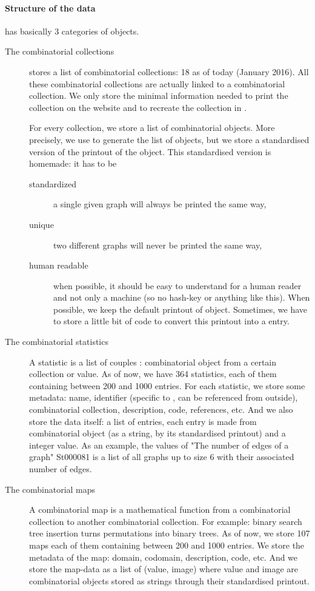 \paragraph{Structure of the data}

\FindStat has basically 3 categories of objects.

\begin{description}
\item[The combinatorial collections] \FindStat stores a list of combinatorial collections: 18 as of today (January 2016). All these combinatorial collections are actually linked to a \SageMath combinatorial collection. We only store the minimal  information needed to print the collection on the website and to recreate the collection in \SageMath.

For every collection, we store a list of combinatorial objects. More precisely, we use \SageMath to generate the list of objects,
but we store a standardised version of the printout of the object. This standardised version is homemade: it has to be
\begin{description}
\item[standardized] a single given graph will always be printed the same way,
\item[unique] two different graphs will never be printed the same way,
\item[human readable] when possible, it should be easy to understand for a human reader and not only a machine (so no hash-key or anything like this).
When possible, we keep the default printout of \SageMath object. Sometimes, we have to store a little bit of code to convert this printout into a
\SageMath entry.
\end{description}

\item[The combinatorial statistics] A statistic is a list of couples : combinatorial object from a certain collection or value. As of now, we have 364 statistics,
each of them containing between 200 and 1000 entries. For each statistic, we store some metadata: name, identifier
(specific to \FindStat, can be referenced from outside), combinatorial collection, description, code, references, etc. And we also store the data itself: a list of entries,
each entry is made from combinatorial object (as a string, by its standardised printout) and a integer value. As an example, the values of "The number of edges of a graph"
St000081 is a list of all graphs up to size 6 with their associated number of edges.

\item[The combinatorial maps] A combinatorial map is a mathematical function from a combinatorial collection to another combinatorial collection. For example: binary search
tree insertion turns permutations into binary trees. As of now, we store 107 maps each of them containing between 200 and 1000 entries. We store the metadata of the map: domain, codomain, description, code, etc. And we store the map-data as a list of (value, image)
where value and image are combinatorial objects stored as strings through their standardised printout.
\end{description}

